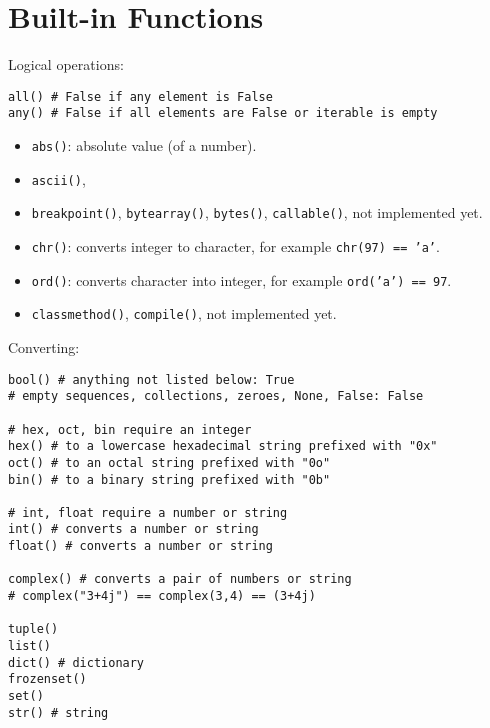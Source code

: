 \section{Built-in Functions}
Logical operations:
\begin{verbatim}
all() # False if any element is False
any() # False if all elements are False or iterable is empty
\end{verbatim}

\begin{itemize}

\item \texttt{abs()}: absolute value (of a number).

\item
\texttt{ascii()},

\item
\texttt{breakpoint()},
\texttt{bytearray()},
\texttt{bytes()},
\texttt{callable()},
\dotfill not implemented yet.

\item \texttt{chr()}: converts integer to character, for example \texttt{chr(97) == 'a'}.

\item \texttt{ord()}: converts character into integer, for example \texttt{ord('a') == 97}.

\item
\texttt{classmethod()},
\texttt{compile()},
\dotfill not implemented yet.
\end{itemize}

Converting:
\begin{verbatim}
bool() # anything not listed below: True
# empty sequences, collections, zeroes, None, False: False

# hex, oct, bin require an integer
hex() # to a lowercase hexadecimal string prefixed with "0x"
oct() # to an octal string prefixed with "0o"
bin() # to a binary string prefixed with "0b"
       
# int, float require a number or string
int() # converts a number or string
float() # converts a number or string

complex() # converts a pair of numbers or string
# complex("3+4j") == complex(3,4) == (3+4j)

tuple()
list()
dict() # dictionary
frozenset()
set()
str() # string
\end{verbatim}

